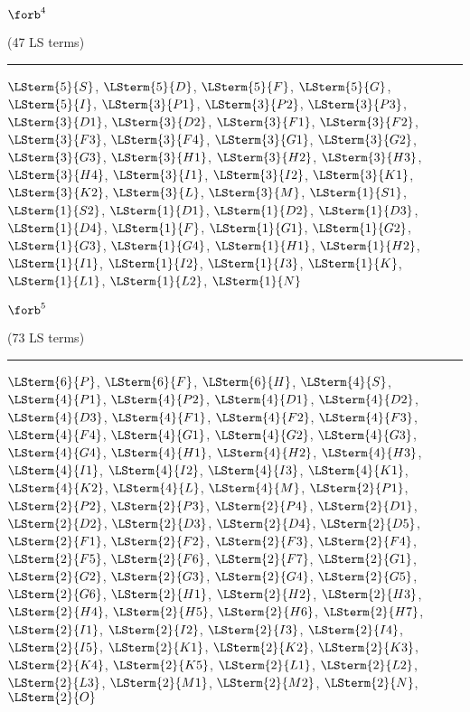 \begin{mdframed}\begin{center}
$\forb^{4}$

(47 LS terms)
\vspace{0.25cm}\hrule\vspace{0.25cm}

$\LSterm{5}{S}$, $\LSterm{5}{D}$, $\LSterm{5}{F}$, $\LSterm{5}{G}$, $\LSterm{5}{I}$, $\LSterm{3}{P1}$, $\LSterm{3}{P2}$, $\LSterm{3}{P3}$, $\LSterm{3}{D1}$, $\LSterm{3}{D2}$, $\LSterm{3}{F1}$, $\LSterm{3}{F2}$, $\LSterm{3}{F3}$, $\LSterm{3}{F4}$, $\LSterm{3}{G1}$, $\LSterm{3}{G2}$, $\LSterm{3}{G3}$, $\LSterm{3}{H1}$, $\LSterm{3}{H2}$, $\LSterm{3}{H3}$, $\LSterm{3}{H4}$, $\LSterm{3}{I1}$, $\LSterm{3}{I2}$, $\LSterm{3}{K1}$, $\LSterm{3}{K2}$, $\LSterm{3}{L}$, $\LSterm{3}{M}$, $\LSterm{1}{S1}$, $\LSterm{1}{S2}$, $\LSterm{1}{D1}$, $\LSterm{1}{D2}$, $\LSterm{1}{D3}$, $\LSterm{1}{D4}$, $\LSterm{1}{F}$, $\LSterm{1}{G1}$, $\LSterm{1}{G2}$, $\LSterm{1}{G3}$, $\LSterm{1}{G4}$, $\LSterm{1}{H1}$, $\LSterm{1}{H2}$, $\LSterm{1}{I1}$, $\LSterm{1}{I2}$, $\LSterm{1}{I3}$, $\LSterm{1}{K}$, $\LSterm{1}{L1}$, $\LSterm{1}{L2}$, $\LSterm{1}{N}$
\end{center}\end{mdframed}

\begin{mdframed}\begin{center}
$\forb^{5}$

(73 LS terms)
\vspace{0.25cm}\hrule\vspace{0.25cm}

$\LSterm{6}{P}$, $\LSterm{6}{F}$, $\LSterm{6}{H}$, $\LSterm{4}{S}$, $\LSterm{4}{P1}$, $\LSterm{4}{P2}$, $\LSterm{4}{D1}$, $\LSterm{4}{D2}$, $\LSterm{4}{D3}$, $\LSterm{4}{F1}$, $\LSterm{4}{F2}$, $\LSterm{4}{F3}$, $\LSterm{4}{F4}$, $\LSterm{4}{G1}$, $\LSterm{4}{G2}$, $\LSterm{4}{G3}$, $\LSterm{4}{G4}$, $\LSterm{4}{H1}$, $\LSterm{4}{H2}$, $\LSterm{4}{H3}$, $\LSterm{4}{I1}$, $\LSterm{4}{I2}$, $\LSterm{4}{I3}$, $\LSterm{4}{K1}$, $\LSterm{4}{K2}$, $\LSterm{4}{L}$, $\LSterm{4}{M}$, $\LSterm{2}{P1}$, $\LSterm{2}{P2}$, $\LSterm{2}{P3}$, $\LSterm{2}{P4}$, $\LSterm{2}{D1}$, $\LSterm{2}{D2}$, $\LSterm{2}{D3}$, $\LSterm{2}{D4}$, $\LSterm{2}{D5}$, $\LSterm{2}{F1}$, $\LSterm{2}{F2}$, $\LSterm{2}{F3}$, $\LSterm{2}{F4}$, $\LSterm{2}{F5}$, $\LSterm{2}{F6}$, $\LSterm{2}{F7}$, $\LSterm{2}{G1}$, $\LSterm{2}{G2}$, $\LSterm{2}{G3}$, $\LSterm{2}{G4}$, $\LSterm{2}{G5}$, $\LSterm{2}{G6}$, $\LSterm{2}{H1}$, $\LSterm{2}{H2}$, $\LSterm{2}{H3}$, $\LSterm{2}{H4}$, $\LSterm{2}{H5}$, $\LSterm{2}{H6}$, $\LSterm{2}{H7}$, $\LSterm{2}{I1}$, $\LSterm{2}{I2}$, $\LSterm{2}{I3}$, $\LSterm{2}{I4}$, $\LSterm{2}{I5}$, $\LSterm{2}{K1}$, $\LSterm{2}{K2}$, $\LSterm{2}{K3}$, $\LSterm{2}{K4}$, $\LSterm{2}{K5}$, $\LSterm{2}{L1}$, $\LSterm{2}{L2}$, $\LSterm{2}{L3}$, $\LSterm{2}{M1}$, $\LSterm{2}{M2}$, $\LSterm{2}{N}$, $\LSterm{2}{O}$
\end{center}\end{mdframed}

